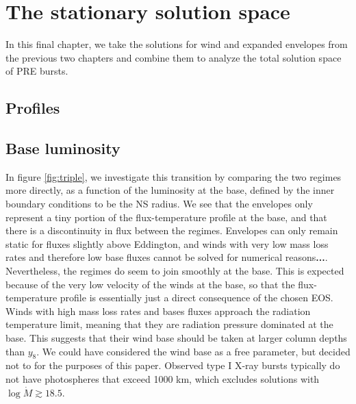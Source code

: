 \documentclass[../main.tex]{subfiles}
\begin{document}
\section{The stationary solution space}

In this final chapter, we take the solutions for wind and expanded envelopes from the previous two chapters and combine them to analyze the total solution space of PRE bursts.

\subsection{Profiles}




\subsection{Base luminosity}

In figure \ref{fig:triple}, we investigate this transition by comparing the two regimes more directly, as a function of the luminosity at the base, defined by the inner boundary conditions to be the NS radius.  We see that the envelopes only represent a tiny portion of the flux-temperature profile at the base, and that there is a discontinuity in flux between the regimes.  Envelopes can only remain static for fluxes slightly above Eddington, and winds with very low mass loss rates and therefore low base fluxes cannot be solved for numerical reasons\textbf{...}. Nevertheless, the regimes do seem to join smoothly at the base.  This is expected because of the very low velocity of the winds at the base, so that the flux-temperature profile is essentially just a direct consequence of the chosen EOS. Winds with high mass loss rates and bases fluxes approach the radiation temperature limit, meaning that they are radiation pressure dominated at the base.  This suggests that their wind base should be taken at larger column depths than $y_8$.  We could have considered the wind base as a free parameter, but decided not to for the purposes of this paper.  Observed type I X-ray bursts typically do not have photospheres that exceed 1000 km, which excludes solutions with $\log\dot{M}\gtrsim 18.5$.
\end{document}
